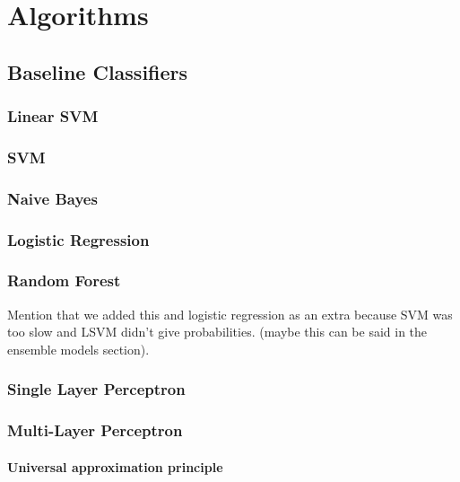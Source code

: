 \documentclass[epsfig,a4paper,11pt,titlepage,twoside,openany]{book}
\begin{document}
\chapter{Algorithms}
\label{chap:algorithms}

\section{Baseline Classifiers}
\label{sec:baseline-classifiers}

\subsection{Linear SVM}
\label{sec:clf-lsvm}

\subsection{SVM}
\label{sec:clf-svm}

\subsection{Naive Bayes}
\label{sec:clf-nb}

\subsection{Logistic Regression}
\label{sec:clf-lr}

\subsection{Random Forest}
\label{sec:clf-rgc}

Mention that we added this and logistic regression as an extra because SVM was
too slow and LSVM didn't give probabilities. (maybe this can be said in the
ensemble models section).

\subsection{Single Layer Perceptron}
\label{sec:clf-slp}

\subsection{Multi-Layer Perceptron}
\label{sec:clf-mlp}

\subsubsection{Universal approximation principle}
\label{sec:universal-apprx-principle}
\end{document}
